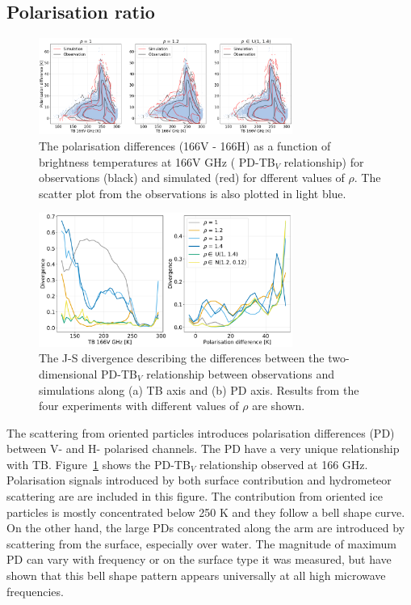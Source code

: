 \documentclass[amt, manuscript]{copernicus}
\begin{document}
\subsection{Polarisation ratio}
\label{sec:polratio}
\begin{figure}[t]
	\includegraphics[width=8.3cm]{Figures/PD_166.png}
	\caption{The polarisation differences (166V - 166H) as a function of
		brightness temperatures at 166V GHz ( PD-TB$_V$ relationship) for observations (black) and simulated (red) for dfferent values of $\rho$. The scatter plot from the observations is also plotted in light blue.}
	\label{fig:PD_166}
\end{figure}
\begin{figure}[t]
	\includegraphics[width=8.3cm]{Figures/divergence.pdf}
	\caption{The J-S divergence describing the differences between the two-dimensional PD-TB$_V$ relationship between observations and simulations along (a) TB axis and (b) PD axis. Results from the four experiments with different values of $\rho$ are shown. }
	\label{fig:divergence_PD}
\end{figure}

The scattering from oriented particles introduces polarisation differences (PD) between V- and H- polarised channels. The PD have a very unique relationship with TB. Figure~\ref{fig:PD_166} shows the PD-TB$_V$ relationship observed at 166\,\,GHz. Polarisation signals introduced by both surface contribution and hydrometeor scattering are are included in this figure. The contribution from oriented ice particles is mostly concentrated below 250\,\,K and they follow a bell shape curve. On the other hand, the large PDs concentrated along the arm are introduced by scattering from the surface, especially over water.  The magnitude of maximum PD can vary with frequency or on the surface type it was measured, but \citet{gong} have shown that this bell shape pattern appears universally at all high microwave frequencies.
\end{document}
